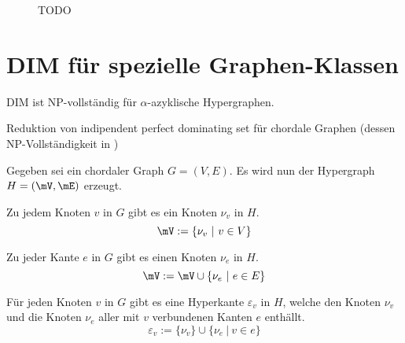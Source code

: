 \begin{figure}[htb]
\centering
{}
\caption{TODO}
\label{pic:bsp_BnB_1}
\end{figure}

\section{DIM für spezielle Graphen-Klassen}
\clearpage
\begin{Theorem}
	DIM ist NP-vollständig für $\alpha$-azyklische Hypergraphen.
\end{Theorem}
Reduktion von indipendent perfect dominating set für chordale Graphen (dessen NP-Vollständigkeit in \cite{ChainChin1996147})

Gegeben sei ein chordaler Graph $G=(V,E)$. Es wird nun der Hypergraph $H=(\mV,\mE)$ erzeugt.

Zu jedem Knoten $v$ in $G$ gibt es ein Knoten $\nu_v$ in $H$. $$\mV := \{\nu_v\ |\ v \in V\}$$

Zu jeder Kante $e$ in $G$ gibt es einen Knoten $\nu_e$ in $H$. $$\mV := \mV \cup \{\nu_e\ |\ e \in E\}$$

Für jeden Knoten $v$ in $G$ gibt es eine Hyperkante $\varepsilon_v$ in $H$, welche den Knoten $\nu_v$ und die Knoten $\nu_e$ aller mit $v$ verbundenen Kanten $e$ enthällt. $$\varepsilon_v := \{\nu_v\} \cup \{\nu_e\ |\ v\in e\}$$

